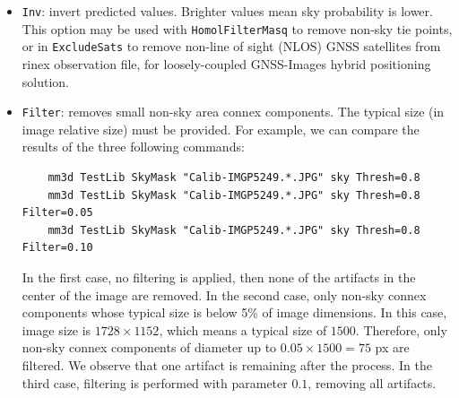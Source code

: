 \begin{itemize}
	\item  \texttt{Inv}: invert predicted values. Brighter values mean sky probability is lower. This option may be used with \texttt{HomolFilterMasq} to remove non-sky tie points, or in \texttt{ExcludeSats} to remove non-line of sight (NLOS) GNSS satellites from rinex observation file, for loosely-coupled GNSS-Images hybrid positioning solution. \newline
	
	\item \texttt{Filter}: removes small non-sky area connex components. The typical size (in image relative size) must be provided. For example, we can compare the results of the three following commands: \newline
	
	\begin{verbatim}
	mm3d TestLib SkyMask "Calib-IMGP5249.*.JPG" sky Thresh=0.8
	mm3d TestLib SkyMask "Calib-IMGP5249.*.JPG" sky Thresh=0.8 Filter=0.05
	mm3d TestLib SkyMask "Calib-IMGP5249.*.JPG" sky Thresh=0.8 Filter=0.10
	\end{verbatim}   
	
	\vspace{0.5cm}
	
	In the first case, no filtering is applied, then none of the artifacts in the center of the image are removed. In the second case, only non-sky connex components whose typical size is below 5\% of image dimensions. In this case, image size is $1728 \times 1152$, which means a typical size of $1500$. Therefore, only non-sky connex components of diameter up to $0.05 \times 1500 = 75$ px are filtered. We observe that one artifact is remaining after the process. In the third case, filtering is performed with parameter $0.1$, removing all artifacts. \newline
	

\end{itemize}
